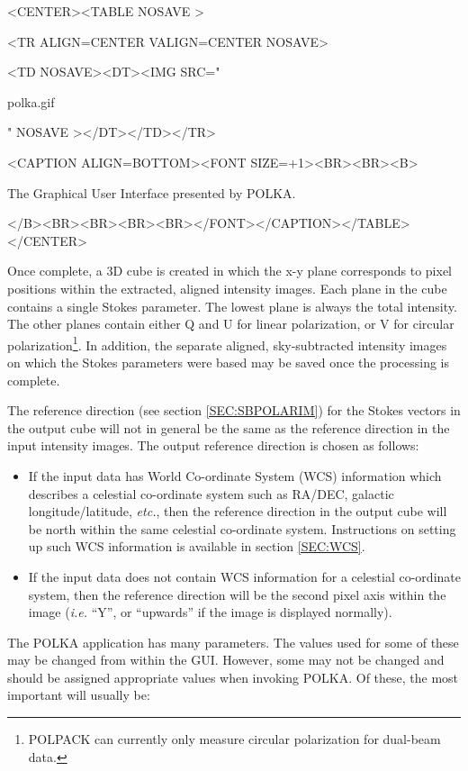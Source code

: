 \documentclass[twoside,11pt]{article}
\newcommand{\hyperref}[4]{#2\ref{#4}#3}
\renewcommand{\_}{\texttt{\symbol{95}}}
\newcommand{\htmlfig}[3]{
   \label{#1}
   \begin{rawhtml} <CENTER><TABLE NOSAVE > \end{rawhtml}
   \begin{rawhtml} <TR ALIGN=CENTER VALIGN=CENTER NOSAVE> \end{rawhtml}
   \begin{rawhtml} <TD NOSAVE><DT><IMG SRC=" \end{rawhtml}
   #2
   \begin{rawhtml} " NOSAVE ></DT></TD></TR> \end{rawhtml}
   \begin{rawhtml} <CAPTION ALIGN=BOTTOM><FONT SIZE=+1><BR><BR><B> \end{rawhtml}
   #3 
   \begin{rawhtml} </B><BR><BR><BR><BR></FONT></CAPTION></TABLE></CENTER> \end{rawhtml}
}
\begin{document}
\begin{htmlonly}
\htmlfig{fig:polka}{polka.gif}{
The Graphical User Interface presented by POLKA.}
\end{htmlonly}

Once complete, a 3D cube is created in which the x-y plane corresponds to
pixel positions within the extracted, aligned intensity images. Each
plane in the cube contains a single Stokes parameter. The lowest plane is
always the total intensity. The other planes contain either Q and U for
linear polarization, or V for circular polarization\footnote{POLPACK can
currently only measure circular polarization for dual-beam data.}. In
addition, the separate aligned, sky-subtracted intensity images on which
the Stokes parameters were based may be saved once the processing is
complete.

The reference direction (see \hyperref{this section}{section }
{}{SEC:SBPOLARIM}) for the Stokes vectors in the output cube will
not in general be the same as the reference direction in the input 
intensity images. The output reference direction is chosen as follows:

\begin{itemize}
\item If the input data has World Co-ordinate System (WCS) information
which describes a celestial co-ordinate system such as RA/DEC, galactic 
longitude/latitude, \emph{etc.}, then the reference direction in the output cube
will be north within the same celestial co-ordinate system.
Instructions on setting up such WCS information is available
\hyperref{here}{in section }{}{SEC:WCS}.

\item If the input data does not contain WCS information for a celestial
co-ordinate system, then the reference direction will be the second pixel
axis within the image (\emph{i.e.} ``Y'', or ``upwards'' if the image is
displayed normally).
\end{itemize}

The POLKA application has many parameters. The values used for some of
these may be changed from within the GUI. However, some may not be
changed and should be assigned appropriate values when invoking POLKA.
Of these, the most important will usually be:
\end{document}
